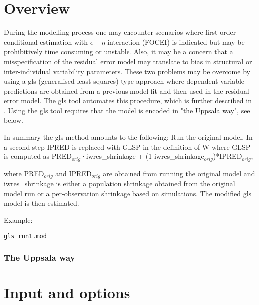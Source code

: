 



\maketitle
\newcommand{\guidetoolname}{gls}


\section{Overview}
During the modelling process one may encounter scenarios where first-order conditional estimation with $\epsilon - \eta$ 
interaction (FOCEI) is indicated but may be prohibitively time consuming or unstable. Also, it may be a concern that a misspecification 
of the residual error model may translate to bias in structural or inter-individual variability parameters. These two problems may be 
overcome by using a gls (generalised least squares) type approach where dependent variable predictions are obtained from a 
previous model fit and then used in the residual error model. The gls tool automates this procedure, which is further described 
in \cite{Ivaturi2}.
Using the gls tool requires that the model is encoded in "the Uppsala way", see below.

In summary the gls method amounts to the following: Run the original model. In a second step IPRED is replaced with GLSP in 
the definition of W where GLSP is computed as 
PRED$_{orig}$·iwres\_shrinkage + (1-iwres\_shrinkage$_{orig}$)*IPRED$_{orig}$, 

where  PRED$_{orig}$ and IPRED$_{orig}$ are obtained from running the original model and iwres\_shrinkage is either a population 
shrinkage obtained from the original model run or a per-observation shrinkage based on simulations.
The modified gls model is then estimated.

Example:
\begin{verbatim}
gls run1.mod
\end{verbatim}

\subsubsection*{The Uppsala way}


\section{Input and options}

